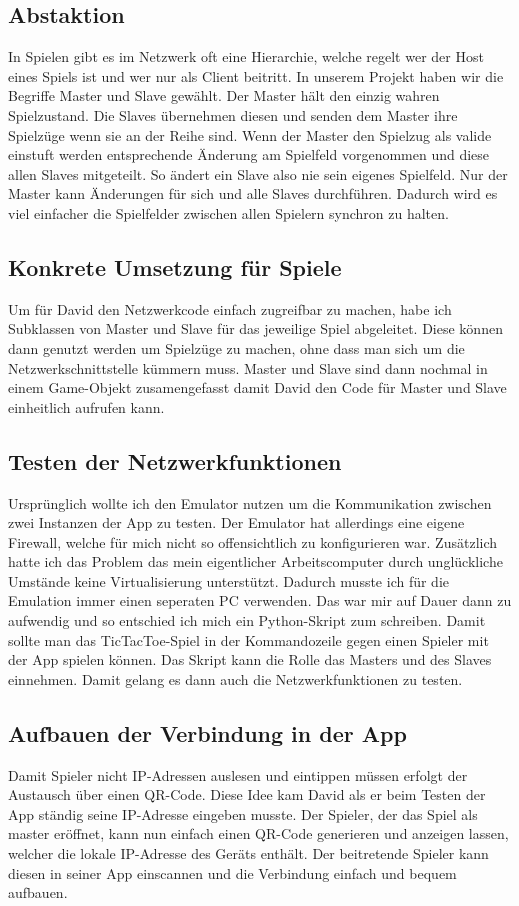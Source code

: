\subsection{Abstaktion}
In Spielen gibt es im Netzwerk oft eine Hierarchie, welche regelt wer der Host eines Spiels ist und wer nur als Client beitritt.
In unserem Projekt haben wir die Begriffe Master und Slave gewählt.
Der Master hält den einzig wahren Spielzustand. Die Slaves übernehmen diesen und senden dem Master ihre Spielzüge wenn
sie an der Reihe sind. Wenn der Master den Spielzug als valide einstuft werden entsprechende Änderung
am Spielfeld vorgenommen und diese allen Slaves mitgeteilt.
So ändert ein Slave also nie sein eigenes Spielfeld. Nur der Master kann Änderungen für sich und alle Slaves durchführen.
Dadurch wird es viel einfacher die Spielfelder zwischen allen Spielern synchron zu halten.
\subsection{Konkrete Umsetzung für Spiele}
Um für David den Netzwerkcode einfach zugreifbar zu machen, habe ich Subklassen von Master und Slave für das jeweilige Spiel abgeleitet.
Diese können dann genutzt werden um Spielzüge zu machen, ohne dass man sich um die Netzwerkschnittstelle kümmern muss.
Master und Slave sind dann nochmal in einem Game-Objekt zusamengefasst damit David den Code für Master und Slave
einheitlich aufrufen kann.

\subsection{Testen der Netzwerkfunktionen}
Ursprünglich wollte ich den Emulator nutzen um die Kommunikation zwischen zwei Instanzen der App zu testen.
Der Emulator hat allerdings eine eigene Firewall, welche für mich nicht so offensichtlich zu konfigurieren war.
Zusätzlich hatte ich das Problem das mein eigentlicher Arbeitscomputer durch unglückliche Umstände keine Virtualisierung unterstützt.
Dadurch musste ich für die Emulation immer einen seperaten PC verwenden. Das war mir auf Dauer dann zu aufwendig und so entschied ich mich
ein Python-Skript zum schreiben. Damit sollte man das TicTacToe-Spiel in der Kommandozeile gegen einen Spieler mit der App spielen können.
Das Skript kann die Rolle das Masters und des Slaves einnehmen. Damit gelang es dann auch die Netzwerkfunktionen zu testen.

\subsection{Aufbauen der Verbindung in der App}
Damit Spieler nicht IP-Adressen auslesen und eintippen müssen erfolgt der Austausch über einen
QR-Code. Diese Idee kam David als er beim Testen der App ständig seine IP-Adresse eingeben musste.
Der Spieler, der das Spiel als master eröffnet, kann nun einfach einen QR-Code generieren
und anzeigen lassen, welcher die lokale IP-Adresse des Geräts enthält.
Der beitretende Spieler kann diesen in seiner App einscannen
und die Verbindung einfach und bequem aufbauen.
